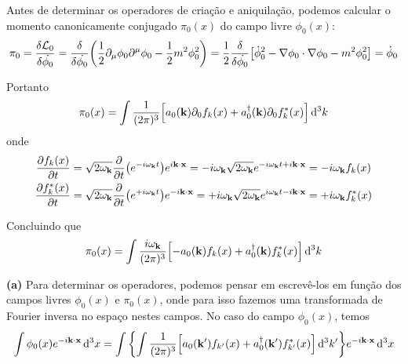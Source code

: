 

Antes de determinar os operadores de criação e aniquilação, podemos calcular o momento canonicamente conjugado $\pi_{0}(x)$ do campo livre $\phi_{0}(x)$:
    \begin{equation*}
        \pi_{0} = \fdv{\mathcal{L}_{0}}{\dot{\phi_{0}}} = \fdv{}{\dot{\phi_{0}}} \qty(\dfrac{1}{2}\partial_{\mu}\phi_{0}\partial^{\mu}\phi_{0} - \dfrac{1}{2}m^2\phi_{0}^2) = \dfrac{1}{2}\fdv{}{\dot{\phi_{0}}} \qty[
            \dot{\phi}_{0}^2 - \nabla\phi_{0}\cdot\nabla\phi_{0} - m^2\phi_{0}^2
        ] = \dot{\phi}_{0}
    \end{equation*}

Portanto
    \begin{equation*}
        \pi_{0}(x) = \int \dfrac{1}{(2\pi)^3} \qty[
            a_{0}(\vb{k}) \partial_{0}f_{k}(x) +
            a_{0}^{\dagger}(\vb{k}) \partial_{0} f_{k}^{\ast}(x)
        ]\dd[3]{k}
    \end{equation*}
onde
    \begin{align}
        \pdv{f_{k}(x)}{t} &= \sqrt{2\omega_{\vb{k}}}\pdv{}{t}\qty(e^{-i\omega_{\vb{k}}t})e^{i\vb{k}\cdot\vb{x}} = -i\omega_{\vb{k}} \sqrt{2\omega_{\vb{k}}}e^{-i\omega_{\vb{k}}t+i\vb{k}\cdot\vb{x}} = -i\omega_{\vb{k}}f_{k}(x) \label{eq: derivative of f}\\
        \pdv{f_{k}^{\ast}(x)}{t} &= \sqrt{2\omega_{\vb{k}}}\pdv{}{t}\qty(e^{+i\omega_{\vb{k}}t})e^{-i\vb{k}\cdot\vb{x}} = +i\omega_{\vb{k}} \sqrt{2\omega_{\vb{k}}}e^{i\omega_{\vb{k}}t-i\vb{k}\cdot\vb{x}} = +i\omega_{\vb{k}}f_{k}^{\ast}(x) \label{eq: derivative of f*}
    \end{align}

Concluindo que
    \begin{equation*}
        \pi_{0}(x) = \int \dfrac{i\omega_{\vb{k}}}{(2\pi)^3} \qty[
            -a_{0}(\vb{k})f_{k}(x) +
            a_{0}^{\dagger}(\vb{k})f_{k}^{\ast}(x)
        ]\dd[3]{k}
    \end{equation*}

\noindent \textbf{(a)} Para determinar os operadores, podemos pensar em escrevê-los em função dos campos livres $\phi_{0}(x)$ e $\pi_{0}(x)$, onde para isso fazemos uma transformada de Fourier inversa no espaço nestes campos. No caso do campo $\phi_{0}(x)$, temos
    \begin{equation*}
        \int \phi_{0}(x)e^{-i\vb{k}\cdot\vb{x}}\dd[3]{x} = \int \qty{\int \dfrac{1}{(2\pi)^3}\qty[
            a_{0}(\vb{k}')f_{k'}(x) + 
            a_{0}^{\dagger}(\vb{k}')f_{k'}^{\ast}(x)
        ]\dd[3]{k'}}e^{-i\vb{k}\cdot\vb{x}}\dd[3]{x}
    \end{equation*}

